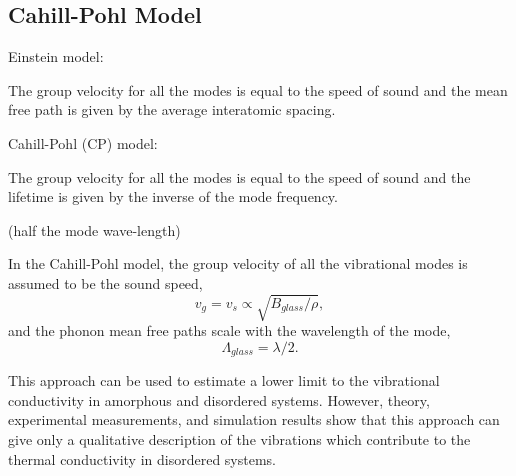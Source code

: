 \documentclass[aps,prb,preprint,superscriptaddress,amsmath,amssymb,floatfix]{revtex4}
\begin{document}
\subsection{\label{S:Lifetimes:}Cahill-Pohl Model}
Einstein model:

The group velocity for all the modes is equal to the speed of sound and the 
mean free path is given by the average interatomic spacing.
\cite{kittel_interpretation_1949,cahill_lower_1992}

Cahill-Pohl (CP) model:

The group velocity for all the modes is equal to the speed of sound and 
the lifetime is given by the inverse of the mode frequency.
\cite{cahill_lower_1992}

(half the mode 
wave-length)

In the Cahill-Pohl model,
\cite{PhysRevB.46.6131} the group velocity of all the vibrational modes is 
assumed to be the sound speed,
\begin{equation}\label{E-Seq}
v_g = v_s \propto \sqrt{B_{glass}/\rho},
\end{equation}
and the phonon mean free paths scale with the wavelength of the mode,
\begin{equation}\label{EQ:M:l_glass}
\Lambda_{glass} = \lambda /2.
\end{equation}

This approach can be used to estimate a lower limit to the vibrational 
conductivity in amorphous and disordered systems.
\cite{cahill_lower_1992,cahill_thermal_1987} 
However, theory,\cite{allen_thermal_1993} experimental measurements,
\cite{graebner_phonon_1986} and simulation results
\cite{shenogin_predicting_2009} show that this approach can give only a 
qualitative description of the vibrations which contribute to the thermal 
conductivity in disordered systems.



\end{document}

